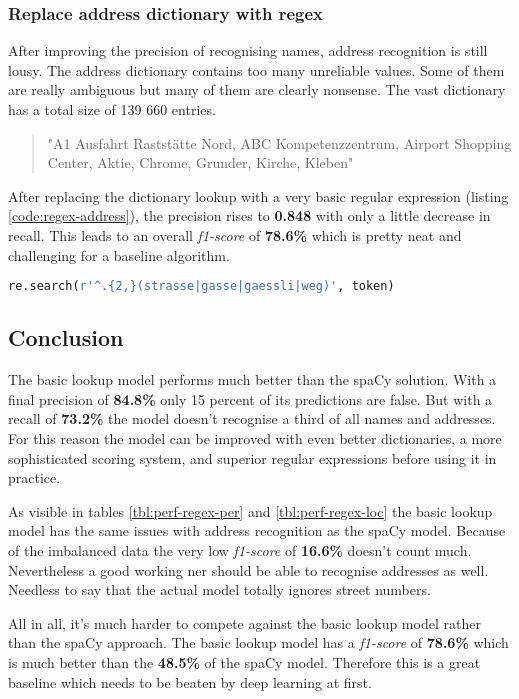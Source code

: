 \subsubsection{Replace address dictionary with regex}

After improving the precision of recognising names, address recognition is still lousy. The address dictionary contains too many unreliable values. Some of them are really ambiguous but many of them are clearly nonsense. The vast dictionary has a total size of 139 660 entries.

\begin{quote}
    "A1 Ausfahrt Raststätte Nord, ABC Kompetenzzentrum, Airport Shopping Center, Aktie, Chrome, Grunder, Kirche, Kleben"
\end{quote}

After replacing the dictionary lookup with a very basic regular expression (listing \ref{code:regex-address}), the precision rises to \textbf{0.848} with only a little decrease in recall. This leads to an overall \emph{f1-score} of \textbf{78.6\%} which is pretty neat and challenging for a baseline algorithm.

\begin{lstlisting}[language=Python, label={code:regex-address}, caption=Very basic regular expression for detecting addresses]
re.search(r'^.{2,}(strasse|gasse|gaessli|weg)', token)
\end{lstlisting}

\subsection{Conclusion}

The basic lookup model performs much better than the spaCy solution. With a final precision of \textbf{84.8\%} only 15 percent of its predictions are false. But with a recall of \textbf{73.2\%} the model doesn't recognise a third of all names and addresses. For this reason the model can be improved with even better dictionaries, a more sophisticated scoring system, and superior regular expressions before using it in practice.

As visible in tables \ref{tbl:perf-regex-per} and \ref{tbl:perf-regex-loc} the basic lookup model has the same issues with address recognition as the spaCy model. Because of the imbalanced data the very low \emph{f1-score} of \textbf{16.6\%} doesn't count much. Nevertheless a good working \acrlong{ner} should be able to recognise addresses as well. Needless to say that the actual model totally ignores street numbers.

All in all, it's much harder to compete against the basic lookup model rather than the spaCy approach. The basic lookup model has a \emph{f1-score} of \textbf{78.6\%} which is much better than the \textbf{48.5\%} of the spaCy model. Therefore this is a great baseline which needs to be beaten by deep learning at first.
